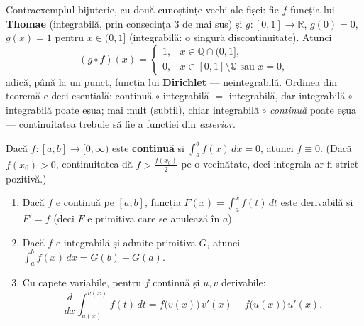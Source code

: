 \begin{obs}
Contraexemplul-bijuterie, cu două cunoștințe vechi ale fișei: fie $f$ funcția lui \textbf{Thomae} (integrabilă, prin consecința 3 de mai sus) și $g:[0,1]\to\mathbb{R}$, $g(0)=0$, $g(x)=1$ pentru $x\in(0,1]$ (integrabilă: o singură discontinuitate). Atunci
\[
(g\circ f)(x)=\begin{cases}1,& x\in\mathbb{Q}\cap(0,1],\\ 0,& x\in[0,1]\setminus\mathbb{Q}\text{ sau }x=0,\end{cases}
\]
adică, până la un punct, funcția lui \textbf{Dirichlet} --- neintegrabilă. Ordinea din teoremă e deci esențială: continuă $\circ$ integrabilă $=$ integrabilă, dar integrabilă $\circ$ integrabilă poate eșua; mai mult (subtil), chiar integrabilă $\circ$ \emph{continuă} poate eșua --- continuitatea trebuie să fie a funcției din \emph{exterior}.
\end{obs}

\begin{teorema}
Dacă $f:[a,b]\to[0,\infty)$ este \textbf{continuă} și $\int_a^b f(x)\,dx=0$, atunci $f\equiv 0$. (Dacă $f(x_0)>0$, continuitatea dă $f>\frac{f(x_0)}2$ pe o vecinătate, deci integrala ar fi strict pozitivă.)
\end{teorema}

\begin{teorema}
\begin{enumerate}[leftmargin=*, itemsep=1pt]
\item Dacă $f$ e continuă pe $[a,b]$, funcția $F(x)=\displaystyle\int_a^x f(t)\,dt$ este derivabilă și $F'=f$ (deci $F$ e primitiva care se anulează în $a$).
\item Dacă $f$ e integrabilă și admite primitiva $G$, atunci $\displaystyle\int_a^b f(x)\,dx=G(b)-G(a)$.
\item Cu capete variabile, pentru $f$ continuă și $u,v$ derivabile:
\[
\frac{d}{dx}\int_{u(x)}^{v(x)}f(t)\,dt=f\big(v(x)\big)\,v'(x)-f\big(u(x)\big)\,u'(x).
\]
\end{enumerate}
\end{teorema}

